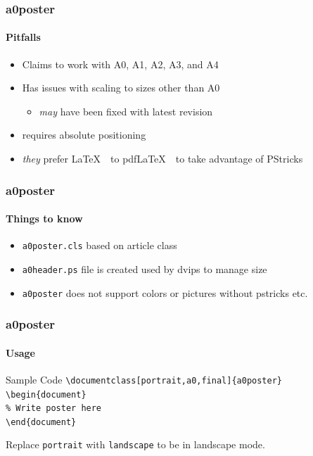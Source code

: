 \documentclass[11pt]{beamer}
\renewcommand{\L}{\LaTeX\ }
\begin{document}
\begin{frame}
\frametitle{a0poster}\framesubtitle{Pitfalls}
				\begin{itemize}
					\item Claims to work with A0, A1, A2, A3, and A4
					\item Has issues with scaling to sizes other than A0
						\begin{itemize} \item \emph{may} have been fixed with latest revision \end{itemize}
					\item	requires absolute positioning
					\item \emph{they} prefer \L\ to pdf\L\ to take advantage of PStricks
			\end{itemize}
\end{frame}

\begin{frame}
\frametitle{a0poster}\framesubtitle{Things to know}
			\begin{itemize}
				\item \verb|a0poster.cls| based on article class
				\item \verb|a0header.ps| file is created used by dvips to manage size
				\item \verb|a0poster| does not support colors or pictures without pstricks etc.
			\end{itemize}
\end{frame}


\begin{frame}
\frametitle{a0poster}\framesubtitle{Usage}
		\begin{block}{Sample Code}
			\texttt{\textbackslash documentclass[portrait,a0,final]\{a0poster\}}\\
			 \texttt{\textbackslash begin\{document\} }\\
			   \texttt{\% Write poster here}\\
			 	\texttt{\textbackslash end\{document\}}
		\end{block}		
		Replace \verb|portrait| with \verb|landscape|  to be in landscape mode.
\end{frame}
\end{document}

